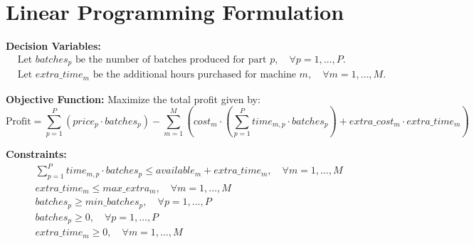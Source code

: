 \documentclass{article}
\begin{document}
\section*{Linear Programming Formulation}

\textbf{Decision Variables:}
\begin{align*}
&\text{Let } batches_p \text{ be the number of batches produced for part } p, \quad \forall p = 1, \ldots, P. \\
&\text{Let } extra\_time_m \text{ be the additional hours purchased for machine } m, \quad \forall m = 1, \ldots, M.
\end{align*}

\textbf{Objective Function:}
Maximize the total profit given by:
\begin{equation}
\text{Profit} = \sum_{p=1}^{P} \left( price_p \cdot batches_p \right) - \sum_{m=1}^{M} \left( cost_m \cdot \left( \sum_{p=1}^{P} time_{m,p} \cdot batches_p \right) + extra\_cost_m \cdot extra\_time_m \right)
\end{equation}

\textbf{Constraints:}
\begin{align}
&\sum_{p=1}^{P} time_{m,p} \cdot batches_p \leq available_m + extra\_time_m, \quad \forall m = 1, \ldots, M \\
&extra\_time_m \leq max\_extra_m, \quad \forall m = 1, \ldots, M \\
&batches_p \geq min\_batches_p, \quad \forall p = 1, \ldots, P \\
&batches_p \geq 0, \quad \forall p = 1, \ldots, P \\
&extra\_time_m \geq 0, \quad \forall m = 1, \ldots, M
\end{align}
\end{document}
